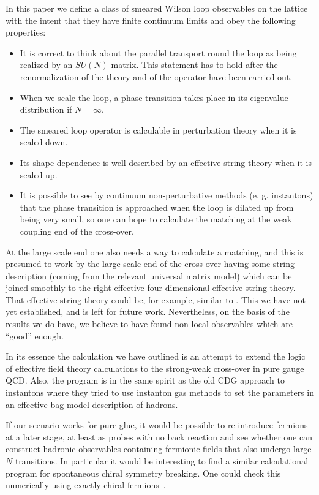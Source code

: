 In this paper we define a
class of smeared Wilson loop observables on the lattice with the
intent that they have finite continuum limits and obey the
following properties:
\begin{itemize}
\item It is correct to think about the parallel
transport round the loop as being realized by an $SU(N)$ matrix.
This statement has to hold after the renormalization of the theory
and of the operator have been carried out.
\item When we scale the loop, a phase
transition takes place in its eigenvalue distribution if
$N=\infty$.
\item The smeared loop operator is calculable in
perturbation theory when it is scaled down.
\item Its shape dependence
is well described by an effective string theory when it is scaled
up.
\item It is possible to see by continuum non-perturbative
methods (e. g. instantons) that the phase transition is approached
when the loop is dilated up from being very small, so one can hope
to calculate the matching at the weak coupling end of the
cross-over.
\end{itemize}
At the large scale end one also needs a way to
calculate a matching, and this is presumed to work by the large
scale end of the cross-over having some string description (coming
from the relevant universal matrix model) which can be joined
smoothly to the right effective four dimensional effective
string theory. That effective string theory
could be, for example, similar
to \cite{ps6}. This we have not yet established, and is left for
future work. Nevertheless, on the basis of the results
we do have, we believe to have found
non-local observables which are ``good'' enough.

In its essence the calculation we have
outlined is an attempt to extend the
logic of effective field theory \cite{effft7} calculations to the
strong-weak cross-over in pure gauge QCD. Also, the program is in
the same spirit as the old CDG approach to instantons
\cite{cdg75} where they tried to use instanton
gas methods to set the parameters in an effective bag-model
description of hadrons.

If our scenario works for pure glue, it
would be possible to re-introduce fermions at a later stage, at
least as probes with no back reaction and see whether one can
construct hadronic observables containing fermionic fields that
also undergo large $N$ transitions. In particular it would be
interesting to find a
similar calculational program
for spontaneous chiral symmetry breaking.
One could check this numerically using exactly chiral
fermions~\cite{overlap}.

